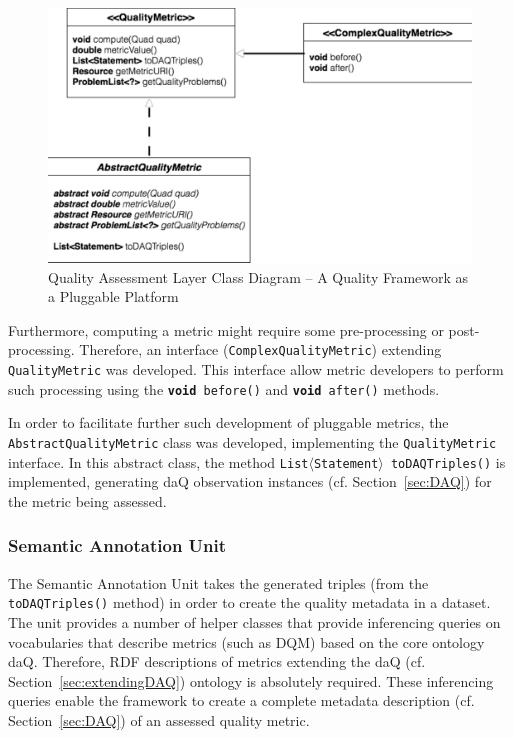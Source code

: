 \begin{figure}[tbph]
\center
\includegraphics[scale=0.3]{images/classdiagram.pdf} 
\caption{Quality Assessment Layer Class Diagram – A Quality Framework as a Pluggable Platform} 
\label{fig:classDiagram}
\end{figure}

Furthermore, computing a metric might require some pre-processing or post-processing.
Therefore, an interface (\texttt{ComplexQualityMetric}) extending \texttt{QualityMetric} was developed.
This interface allow metric developers to perform such processing using the \texttt{\textbf{void} before()} and \texttt{\textbf{void} after()} methods.

In order to facilitate further such development of pluggable metrics, the \texttt{AbstractQualityMetric} class was developed, implementing the \texttt{QualityMetric} interface.
In this abstract class, the method \texttt{List$\langle$Statement$\rangle$ toDAQTriples()} is implemented, generating daQ observation instances (cf. Section~\ref{sec:DAQ}) for the metric being assessed. 

\subsubsection{Semantic Annotation Unit}
The Semantic Annotation Unit takes the generated triples (from the \texttt{toDAQTriples()} method) in order to create the quality metadata in a dataset.
The unit provides a number of helper classes that provide inferencing queries on vocabularies that describe metrics (such as DQM) based on the core ontology daQ.
Therefore, RDF descriptions of metrics extending the daQ (cf. Section~\ref{sec:extendingDAQ}) ontology is absolutely required.
These inferencing queries enable the framework to create a complete metadata description (cf. Section~\ref{sec:DAQ}) of an assessed quality metric.

